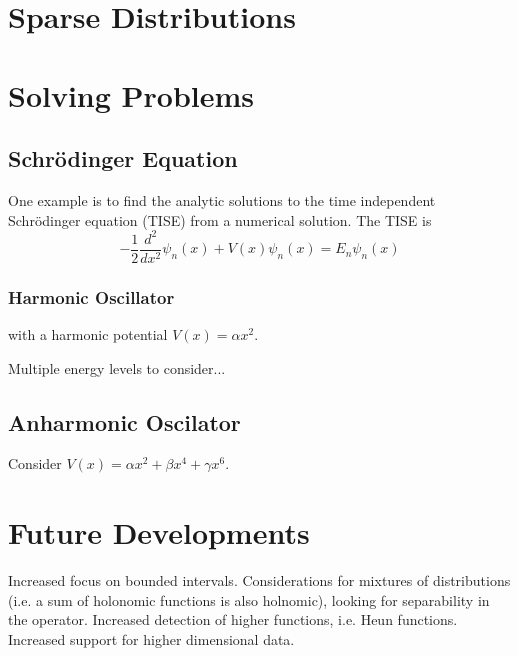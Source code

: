 \documentclass{article}
\begin{document}
\section{Sparse Distributions}

\section{Solving Problems}

\subsection{Schr\"odinger Equation}
One example is to find the analytic solutions to the time independent Schr\"odinger equation (TISE) from a numerical solution. The TISE is
$$
- \frac{1}{2}\frac{d^2}{dx^2} \psi_n(x) + V(x)\psi_n(x) = E_n \psi_n(x)
$$



\subsubsection{Harmonic Oscillator}


with a harmonic potential 
$V(x) = \alpha x^2$.



Multiple energy levels to consider...

\subsection{Anharmonic Oscilator}
Consider $V(x) = \alpha x^2 + \beta x^4 + \gamma x^6$.


\section{Future Developments}
Increased focus on bounded intervals.
Considerations for mixtures of distributions (i.e. a sum of holonomic functions is also holnomic), looking for separability in the operator.
Increased detection of higher functions, i.e. Heun functions.
Increased support for higher dimensional data.


{}

\end{document}

